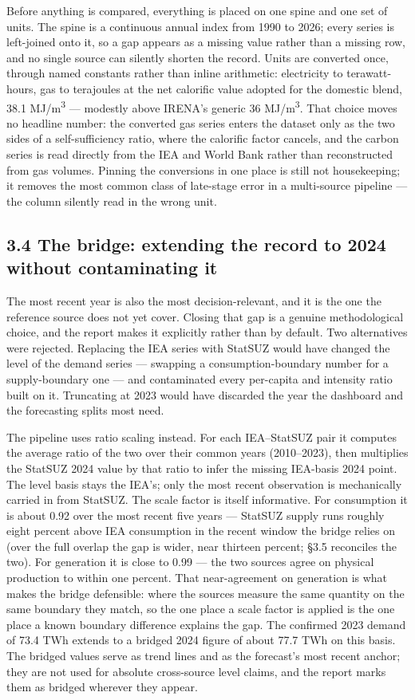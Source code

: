 \documentclass[10pt,twocolumn]{article}
\begin{document}
Before anything is compared, everything is placed on one spine and one set of units. The spine is a continuous annual index from 1990 to 2026; every series is left-joined onto it, so a gap appears as a missing value rather than a missing row, and no single source can silently shorten the record. Units are converted once, through named constants rather than inline arithmetic: electricity to terawatt-hours, gas to terajoules at the net calorific value adopted for the domestic blend, 38.1 MJ/m\textsuperscript{3} --- modestly above IRENA's generic 36 MJ/m\textsuperscript{3}. That choice moves no headline number: the converted gas series enters the dataset only as the two sides of a self-sufficiency ratio, where the calorific factor cancels, and the carbon series is read directly from the IEA and World Bank rather than reconstructed from gas volumes. Pinning the conversions in one place is still not housekeeping; it removes the most common class of late-stage error in a multi-source pipeline --- the column silently read in the wrong unit.

\subsection*{3.4 The bridge: extending the record to 2024 without contaminating it}

The most recent year is also the most decision-relevant, and it is the one the reference source does not yet cover. Closing that gap is a genuine methodological choice, and the report makes it explicitly rather than by default. Two alternatives were rejected. Replacing the IEA series with StatSUZ would have changed the level of the demand series --- swapping a consumption-boundary number for a supply-boundary one --- and contaminated every per-capita and intensity ratio built on it. Truncating at 2023 would have discarded the year the dashboard and the forecasting splits most need.

The pipeline uses ratio scaling instead. For each IEA--StatSUZ pair it computes the average ratio of the two over their common years (2010--2023), then multiplies the StatSUZ 2024 value by that ratio to infer the missing IEA-basis 2024 point. The level basis stays the IEA's; only the most recent observation is mechanically carried in from StatSUZ. The scale factor is itself informative. For consumption it is about 0.92 over the most recent five years --- StatSUZ supply runs roughly eight percent above IEA consumption in the recent window the bridge relies on (over the full overlap the gap is wider, near thirteen percent; \S{}3.5 reconciles the two). For generation it is close to 0.99 --- the two sources agree on physical production to within one percent. That near-agreement on generation is what makes the bridge defensible: where the sources measure the same quantity on the same boundary they match, so the one place a scale factor is applied is the one place a known boundary difference explains the gap. The confirmed 2023 demand of 73.4 TWh extends to a bridged 2024 figure of about 77.7 TWh on this basis. The bridged values serve as trend lines and as the forecast's most recent anchor; they are not used for absolute cross-source level claims, and the report marks them as bridged wherever they appear.
\end{document}
